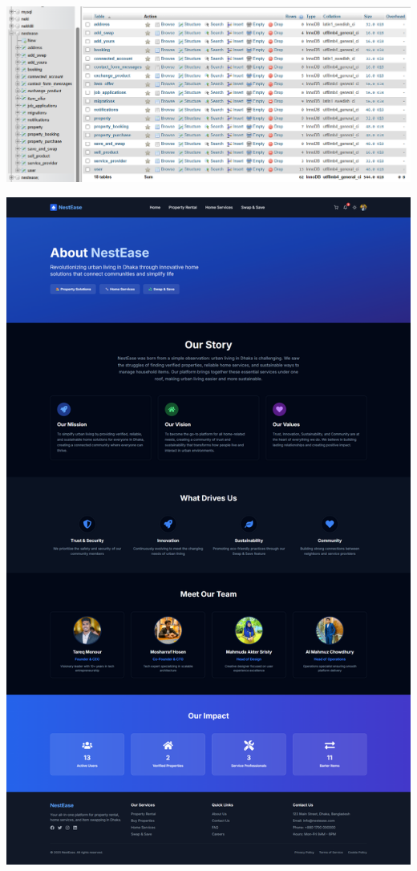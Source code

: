 \documentclass[conference]{IEEEtran}
\begin{document}
\begin{center}
\noindent
\begin{minipage}[t]{0.45\textwidth}
\includegraphics[width=\linewidth]{Project Screenshot/Database.png}
\end{minipage} \hfill
\begin{minipage}[t]{0.45\textwidth}
\includegraphics[width=\linewidth]{Project Screenshot/About Us.png}
\end{minipage}


\end{center}
\end{document}
